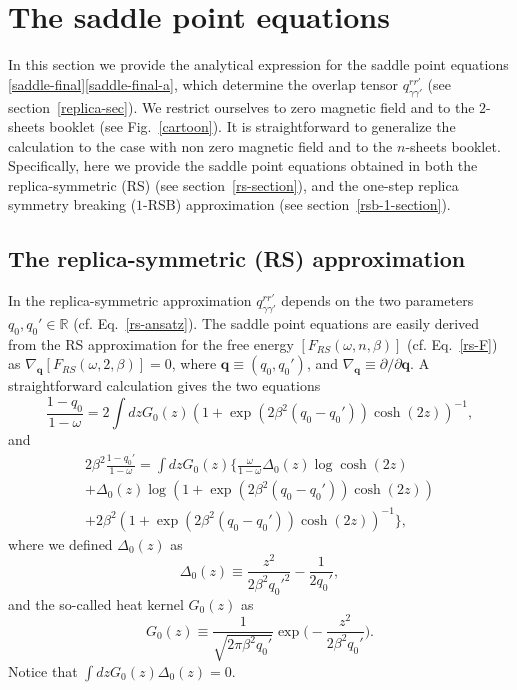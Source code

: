 \documentclass[twocolumn,superscriptaddress,prb,10pt]{revtex4-1}
\begin{document}
\appendix

\section{The saddle point equations} 
\label{saddle-equations}

In this section we provide the analytical expression for the saddle point equations 
\eqref{saddle-final}\eqref{saddle-final-a}, which determine the overlap tensor 
$q_{\gamma\gamma'}^{rr'}$ (see section~\ref{replica-sec}). We restrict ourselves 
to zero magnetic field and to the $2$-sheets booklet (see Fig.~\ref{cartoon}). It is 
straightforward to generalize the calculation to the case with non zero magnetic 
field and to the $n$-sheets booklet. Specifically, here we provide the saddle point 
equations obtained in both the replica-symmetric (RS) (see section~\ref{rs-section}), 
and the one-step replica symmetry breaking ($1$-RSB) approximation (see 
section~\ref{rsb-1-section}). 

\subsection{The replica-symmetric (RS) approximation}

In the replica-symmetric approximation $q_{\gamma\gamma'}^{rr'}$ depends on the two 
parameters $q_0,q_0'\in\mathbb{R}$ (cf. Eq.~\eqref{rs-ansatz}). The saddle point 
equations are easily derived from the RS approximation for the free energy $[F_{RS}
(\omega,n,\beta)]$ (cf. Eq.~\eqref{rs-F}) as $\nabla_{\mathbf{q}}[F_{RS}(\omega,2,
\beta)]=0$, where $\mathbf{q}\equiv(q_0,q_0')$, and $\nabla_{\mathbf{q}}\equiv
\partial/\partial\mathbf{q}$. A straightforward calculation gives the two equations 
%
\begin{equation}
\label{RS-saddle-1}
\frac{1-q_0}{1-\omega}=2\int dz G_0(z)(1+\exp(2\beta^2(q_0-q_0'))\cosh(2z))^{-1},
\end{equation}
%
and
%
\begin{multline}
\label{RS-saddle-2}
2\beta^2\frac{1-q_0'}{1-\omega}=
\int dz G_0(z)\Big\{\frac{\omega}{1-\omega}\Delta_0(z)
\log\cosh(2z)\\
+\Delta_0(z)\log(1+\exp(2\beta^2(q_0-q_0'))\cosh(2z))\\
+2\beta^2(1+\exp(2\beta^2(q_0-q_0'))\cosh(2z))^{-1}
\Big\},
\end{multline}
%
where we defined $\Delta_0(z)$ as 
%
\begin{equation}
\Delta_0(z)\equiv\frac{z^2}{2\beta^2q_0'^2}-\frac{1}{2q_0'},
\end{equation}
%
and the so-called heat kernel $G_0(z)$ as 
%
\begin{equation}
G_0(z)\equiv\frac{1}{\sqrt{2\pi \beta^2 q_0'}}\exp\Big(-\frac{z^2}
{2\beta^2 q_0'}\Big).
\end{equation}
%
Notice that $\int dz G_0(z)\Delta_0(z)=0$.
\end{document}
